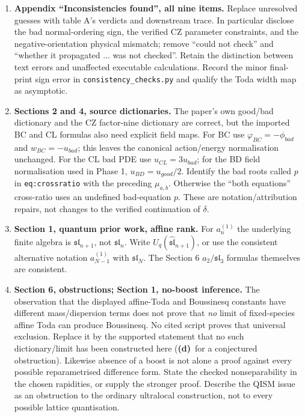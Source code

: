 \documentclass[11pt,a4paper]{article}
\newcommand{\D}{\textsf{\textbf{(d)}}}
\newcommand{\file}[1]{\nolinkurl{#1}}
\begin{document}
\begin{enumerate}[label=R\arabic*.,leftmargin=*,itemsep=8pt]
\item \textbf{Appendix ``Inconsistencies found'', all nine items.}
Replace unresolved guesses with table A's verdicts and downstream trace.
In particular disclose the bad normal-ordering sign, the verified CZ
parameter constraints, and the negative-orientation physical mismatch;
remove ``could not check'' and ``whether it propagated ... was not checked''.
Retain the distinction between text errors and unaffected executable
calculations. Record the minor final-print sign error in
\file{consistency_checks.py} and qualify the Toda width map as asymptotic.

\item \textbf{Sections 2 and 4, source dictionaries.}
The paper's own good/bad dictionary and the CZ factor-nine dictionary are
correct, but the imported BC and CL formulas also need explicit field maps.
For BC use $\varphi_{BC}=-\phi_{bad}$ and
$w_{BC}=-u_{bad}$; this leaves the canonical action/energy normalisation
unchanged. For the CL bad PDE use $u_{CL}=3u_{bad}$; for the BD field
normalisation used in Phase 1, $u_{BD}=u_{good}/2$.
Identify the bad roots called $p$ in \file{eq:crossratio} with the preceding
$\mu_{a,b}$. Otherwise the ``both equations'' cross-ratio uses an undefined
bad-equation $p$. These are notation/attribution repairs, not changes to
the verified continuation of $\delta$.

\item \textbf{Section 1, quantum prior work, affine rank.}
For $a_n^{(1)}$ the underlying finite algebra is
$\mathfrak{sl}_{n+1}$, not $\mathfrak{sl}_n$.
Write $U_q(\widehat{\mathfrak{sl}}_{n+1})$, or use the consistent alternative
notation $a_{N-1}^{(1)}$ with $\mathfrak{sl}_N$.
The Section 6 $a_2/\mathfrak{sl}_3$ formulas themselves are consistent.

\item \textbf{Section 6, obstructions; Section 1, no-boost inference.}
The observation that the displayed affine-Toda and Boussinesq constants
have different mass/dispersion terms does not prove that \emph{no} limit
of fixed-species affine Toda can produce Boussinesq. No cited script proves
that universal exclusion. Replace it by the supported statement that no
such dictionary/limit has been constructed here (\D\ for a conjectured
obstruction). Likewise absence of a boost is not alone a proof against
every possible reparametrised difference form. State the checked
nonseparability in the chosen rapidities, or supply the stronger proof.
Describe the QISM issue as an obstruction to the ordinary ultralocal
construction, not to every possible lattice quantisation.


\end{enumerate}
\end{document}
